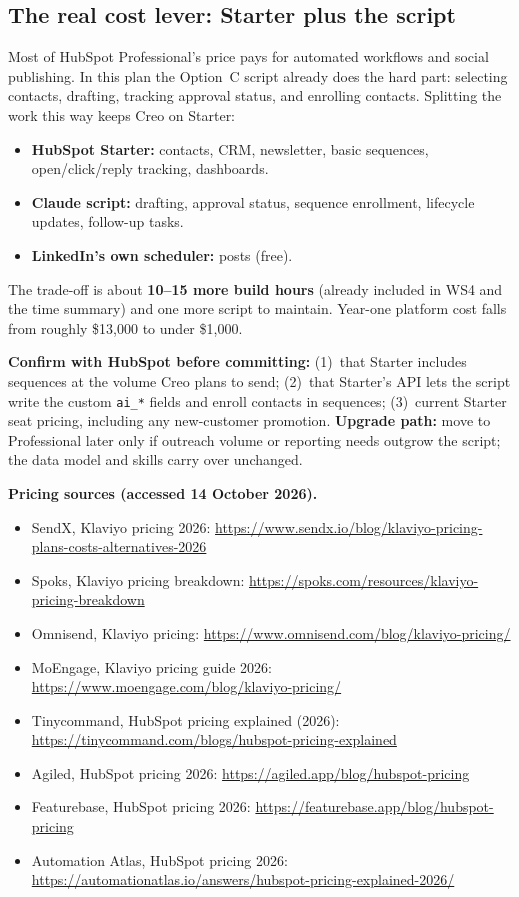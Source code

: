\documentclass[11pt]{article}
\begin{document}
\subsection{The real cost lever: Starter plus the script}
Most of HubSpot Professional's price pays for automated workflows and social publishing. In
this plan the Option~C script already does the hard part: selecting contacts, drafting,
tracking approval status, and enrolling contacts. Splitting the work this way keeps Creo on Starter:
\begin{itemize}
  \item \textbf{HubSpot Starter:} contacts, CRM, newsletter, basic sequences, open/click/reply
  tracking, dashboards.
  \item \textbf{Claude script:} drafting, approval status, sequence enrollment, lifecycle updates,
  follow-up tasks.
  \item \textbf{LinkedIn's own scheduler:} posts (free).
\end{itemize}
The trade-off is about \textbf{10--15 more build hours} (already included in WS4 and the time
summary) and one more script to maintain. Year-one platform cost falls from roughly \$13{,}000
to under \$1{,}000.

\begin{caution}
\textbf{Confirm with HubSpot before committing:} (1)~that Starter includes sequences at the
volume Creo plans to send; (2)~that Starter's API lets the script write the custom
\texttt{ai\_*} fields and enroll contacts in sequences; (3)~current Starter seat pricing,
including any new-customer promotion. \textbf{Upgrade path:} move to Professional later only if
outreach volume or reporting needs outgrow the script; the data model and skills carry over
unchanged.
\end{caution}

\textbf{Pricing sources (accessed 14 October 2026).}
{\small
\begin{itemize}
  \item SendX, Klaviyo pricing 2026: \url{https://www.sendx.io/blog/klaviyo-pricing-plans-costs-alternatives-2026}
  \item Spoks, Klaviyo pricing breakdown: \url{https://spoks.com/resources/klaviyo-pricing-breakdown}
  \item Omnisend, Klaviyo pricing: \url{https://www.omnisend.com/blog/klaviyo-pricing/}
  \item MoEngage, Klaviyo pricing guide 2026: \url{https://www.moengage.com/blog/klaviyo-pricing/}
  \item Tinycommand, HubSpot pricing explained (2026): \url{https://tinycommand.com/blogs/hubspot-pricing-explained}
  \item Agiled, HubSpot pricing 2026: \url{https://agiled.app/blog/hubspot-pricing}
  \item Featurebase, HubSpot pricing 2026: \url{https://featurebase.app/blog/hubspot-pricing}
  \item Automation Atlas, HubSpot pricing 2026: \url{https://automationatlas.io/answers/hubspot-pricing-explained-2026/}
\end{itemize}}
\end{document}
